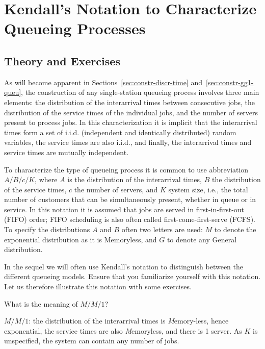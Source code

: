
\section{Kendall's Notation to Characterize Queueing Processes}
\label{sec:kendalls-notation}




\subsection*{Theory and Exercises}

As will become apparent in Sections~\ref{sec:constr-discr-time}
and~\ref{sec:constr-gg1-queu}, the construction of any single-station queueing
process involves three main elements: 
the distribution of the
interarrival times between consecutive jobs, the distribution of the
service times of the individual jobs, and the number of servers
present to process jobs. In this characterization it is implicit that
the interarrival times form a set of i.i.d. (independent and
identically distributed) random variables, the service times are also
i.i.d., and finally, the interarrival times and service times are
mutually independent.

To characterize the type of queueing process it is common to use 
 abbreviation $A/B/c/K$, where $A$ is the distribution of the
interarrival times, $B$ the distribution of the service times, $c$ the
number of servers, and $K$ system size, i.e., the total number of customers that can be simultaneously present, whether in queue or in service. In this notation it
is assumed that jobs are served in first-in-first-out (FIFO) order;
FIFO scheduling is also often called first-come-first-serve (FCFS). To specify the distributions $A$ and $B$ often two letters are used: $M$ to denote the exponential distribution as it is Memoryless, and $G$ to denote any General distribution. 

In the sequel we will often use Kendall's notation  to distinguish between the different queueing models. Ensure that you familiarize yourself with this notation. Let us therefore illustrate this notation with some exercises. 

\begin{exercise}
  What is the meaning of $M/M/1$?
  \begin{solution}
$M/M/1$: the distribution of the interarrival times is
  \emph{M}emory-less, hence exponential, the service times are also
  \emph{M}emoryless, and there is 1 server. As $K$ is unspecified, the system can contain any number of jobs.
  \end{solution}
\end{exercise}

